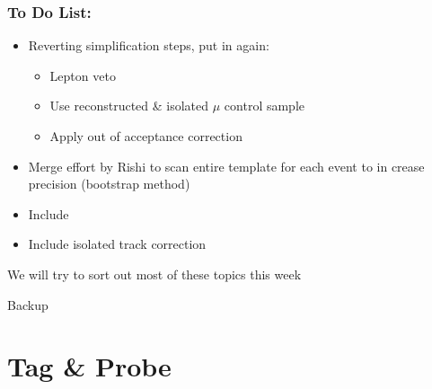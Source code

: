 \documentclass{beamer}
\begin{document}
\begin{frame}
 \frametitle{To Do List:}
 \begin{itemize}
  \item Reverting simplification steps, put in again:
  \begin{itemize}
   \item Lepton veto
   \item Use reconstructed \& isolated $\mu$ control sample
   \item Apply out of acceptance correction 
  \end{itemize}
  \item Merge effort by Rishi to scan entire template for each event to in crease precision  (bootstrap method)
  \item Include \wpj
  \item Include isolated track correction
 \end{itemize}
 
  \begin{block}{}
 \centering
 We will try to sort out most of these topics this week
 \end{block}
 

\end{frame}



\begin{frame}
 \begin{block}{}
 \centering
 \Large Backup
 \end{block}
\end{frame}

\section{Tag \& Probe}
\end{document}
